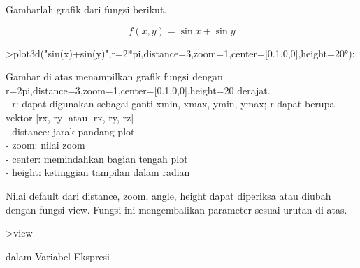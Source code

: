 \documentclass[a4paper,10pt]{article}
\begin{document}
\begin{eulernotebook}
\begin{eulercomment}
\begin{eulercomment}
\begin{eulercomment}
\end{eulercomment}
\begin{eulercomment}
Gambarlah grafik dari fungsi berikut.\\
\end{eulercomment}
\begin{eulerformula}
\[
f(x,y)=\sin{x}+\sin{y}
\]
\end{eulerformula}
\begin{eulerprompt}
>plot3d("sin(x)+sin(y)",r=2*pi,distance=3,zoom=1,center=[0.1,0,0],height=20°):
\end{eulerprompt}
\begin{eulercomment}
Gambar di atas menampilkan grafik fungsi dengan
r=2pi,distance=3,zoom=1,center=[0.1,0,0],height=20 derajat.\\
- r: dapat digunakan sebagai ganti xmin, xmax, ymin, ymax; r dapat
berupa vektor   [rx, ry] atau [rx, ry, rz]\\
- distance: jarak pandang plot\\
- zoom: nilai zoom\\
- center: memindahkan bagian tengah plot\\
- height: ketinggian tampilan dalam radian

Nilai default dari distance, zoom, angle, height dapat diperiksa atau
diubah dengan fungsi view. Fungsi ini mengembalikan parameter sesuai
urutan di atas.
\end{eulercomment}
\begin{eulerprompt}
>view
\end{eulerprompt}
\begin{euleroutput}
  [5,  2.6,  2,  0.4]
\end{euleroutput}
\begin{eulercomment}
\end{eulercomment}
\begin{eulercomment}
dalam Variabel Ekspresi


\end{eulercomment}
\end{eulercomment}
\end{eulercomment}
\end{eulernotebook}
\end{document}
